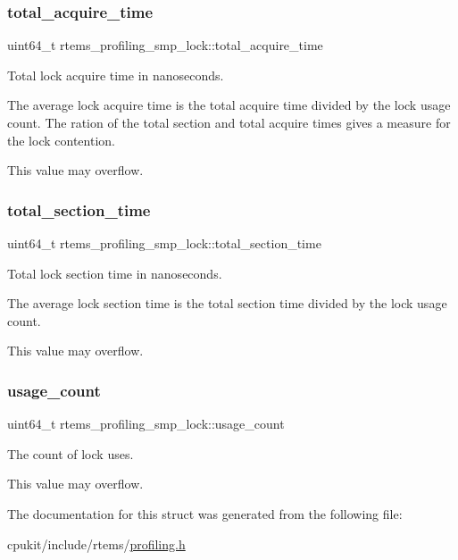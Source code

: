 \subsubsection{\texorpdfstring{total\_acquire\_time}{total\_acquire\_time}}
{\footnotesize\ttfamily uint64\+\_\+t rtems\+\_\+profiling\+\_\+smp\+\_\+lock\+::total\+\_\+acquire\+\_\+time}



Total lock acquire time in nanoseconds. 

The average lock acquire time is the total acquire time divided by the lock usage count. The ration of the total section and total acquire times gives a measure for the lock contention.

This value may overflow. \mbox{\label{structrtems__profiling__smp__lock_a71568f2195b61fdb8ed2e2892dfb3bb8}} 
\subsubsection{\texorpdfstring{total\_section\_time}{total\_section\_time}}
{\footnotesize\ttfamily uint64\+\_\+t rtems\+\_\+profiling\+\_\+smp\+\_\+lock\+::total\+\_\+section\+\_\+time}



Total lock section time in nanoseconds. 

The average lock section time is the total section time divided by the lock usage count.

This value may overflow. \mbox{\label{structrtems__profiling__smp__lock_a2861d4f260254672389b9e1be535618e}} 
\subsubsection{\texorpdfstring{usage\_count}{usage\_count}}
{\footnotesize\ttfamily uint64\+\_\+t rtems\+\_\+profiling\+\_\+smp\+\_\+lock\+::usage\+\_\+count}



The count of lock uses. 

This value may overflow. 

The documentation for this struct was generated from the following file\+:\begin{DoxyCompactItemize}
\item 
cpukit/include/rtems/\mbox{\hyperlink{profiling_8h}{profiling.\+h}}\end{DoxyCompactItemize}
